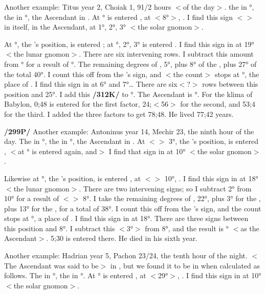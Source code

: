 Another example: Titus year 2, Choiak 1, 91/2 hours $<$of the day$>$. the \Sun\xspace in \Sagittarius\xspace 8°, the \Moon\xspace in \Taurus\xspace 27°, the Ascendant in \Taurus. At \Sagittarius\xspace 8° is entered \Cancer, at \Cancer\xspace $<$8°$>$, \Taurus. I find this sign $<$\Taurus$>$ in itself, in the Ascendant, at 1°, 2°, 3° $<$the solar gnomon$>$. 

At \Taurus\xspace 27°, the \Moon’s position, is entered \Aries; at \Aries\xspace 1°, 2°, 3° is entered \Leo. I find this sign in \Taurus at 19° $<$the lunar gnomon$>$. There are six intervening rows. I subtract this amount from \Taurus\xspace 1° for a result of \Aries\xspace 25°. The remaining degrees of \Aries, 5°, plus 8° of the \Sun, plus 27° of the \Moon\xspace total 40°. I count this off from the \Moon’s sign, and $<$the count$>$ stops at \Gemini\xspace 10°, the place of \Sagittarius. I find this sign in \Aries\xspace at 6° and 7°… There are six$<$?$>$ rows between this position and 25°. I add this \textbf{/312K/} to \Aries\xspace 25°. The Ascendant is \Taurus\xspace 1°. For the klima of Babylon, 0;48 is entered for the first factor, 24;$<$56$>$ for the second, and 53;4 for the third. I added the three factors to get 78;48. He lived 77;42 years.

\textbf{/299P/} Another example: Antoninus year 14, Mechir 23, the ninth hour of the day. The \Sun\xspace in \Pisces\xspace 3°, the \Moon\xspace in \Leo\xspace 13°, the Ascendant in \Cancer. At $<$\Pisces$>$ 3°, the \Sun’s position, is entered \Pisces, $<$at \Pisces\xspace 3° is entered \Pisces\xspace again, and$>$ I find that sign in \Cancer\xspace at 10° $<$the solar gnomon$>$.

Likewise at \Leo\xspace 13°, the \Moon’s position, is entered \Aquarius, at $<$\Aquarius$>$ 10°, \Libra. I find this sign in \Cancer\xspace at 18° $<$the lunar gnomon$>$. There are two intervening signs; so I subtract 2° from 10° for a result of $<$\Cancer$>$ 8°. I take the remaining degrees of \Cancer, 22°, plus 3° for the \Sun, plus 13° for the \Moon, for a total of 38°. I count this off from the \Moon’s sign, and the count stops at \Virgo\xspace 8°, a place of \Libra. I find this sign in \Cancer\xspace at 18°. There are three signs between this position and 8°. I subtract this $<$3°$>$ from 8°, and the result is \Cancer\xspace 5° $<$as the Ascendant$>$. 5;30 is entered there. He died in his sixth year.

Another example: Hadrian year 5, Pachon 23/24, the tenth hour of the night. $<$The Ascendant was said to be$>$ in \Capricorn, but we found it to be in \Aquarius\xspace when calculated as follows. The \Sun\xspace in \Taurus\xspace 29°, the \Moon\xspace in \Scorpio\xspace 15°. At \Taurus\xspace 29° is entered \Scorpio, at \Scorpio\xspace $<$29°$>$, \Libra. I find this sign in \Aquarius\xspace at 10° $<$the solar gnomon$>$. 

